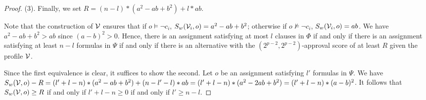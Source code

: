 \begin{proof}
\noindent
(3). Finally, we set $R=(n-l)*(a^2-ab+b^2)+l*ab$.

        Note that the construction of $\mathcal{V}$ ensures that if $o \models \neg c_i$, $S_w(\mathcal{V}_i, o)=
        a^2-ab+b^2$; 
				otherwise if $o \not \models \neg c_i$, $S_w(\mathcal{V}_i, o)=ab$.  We have $a^2-ab+b^2 > ab$ since 
        $(a-b)^2 > 0$.  Hence, there is an assignment 
				satisfying at most $l$ clauses in $\Phi$ 
if and only if there is an assignment satisfying 
				at least $n-l$ formulas in $\Psi$ 
if and only if there is an alternative with the $(2^{p-2},2^{p-2})$-approval
score of at least $R$ given the profile $\mathcal{V}$. 

Since the first equivalence is clear, it suffices to show the second.
Let $o$ be an assignment satisfying $l'$ formulas in $\Psi$. 
We have $S_w(\mathcal{V}, o) - R = (l'+l-n)*(a^2-ab+b^2)+(n-l'-l)*ab
= (l'+l-n)*(a^2-2ab+b^2) = (l'+l-n)*(a-b)^2$.
It follows that $S_w(\mathcal{V}, o) \geq R$ if and only if $l'+l-n \geq 0$
if and only if $l' \geq n-l$.  
\end{proof}

